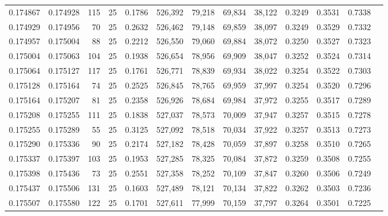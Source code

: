 \begin{tabular}{rrrrrrrrrrrrr}
0.174867 & 0.174928 &   115 &  25 &                                     0.1786 & 526,392 &  79,218 &  69,834 &  38,122 & 0.3249 & 0.3531 & 0.7338 \\
0.174929 & 0.174956 &    70 &  25 &                                     0.2632 & 526,462 &  79,148 &  69,859 &  38,097 & 0.3249 & 0.3529 & 0.7332 \\
0.174957 & 0.175004 &    88 &  25 &                                     0.2212 & 526,550 &  79,060 &  69,884 &  38,072 & 0.3250 & 0.3527 & 0.7323 \\
0.175004 & 0.175063 &   104 &  25 &                                     0.1938 & 526,654 &  78,956 &  69,909 &  38,047 & 0.3252 & 0.3524 & 0.7314 \\
0.175064 & 0.175127 &   117 &  25 &                                     0.1761 & 526,771 &  78,839 &  69,934 &  38,022 & 0.3254 & 0.3522 & 0.7303 \\
0.175128 & 0.175164 &    74 &  25 &                                     0.2525 & 526,845 &  78,765 &  69,959 &  37,997 & 0.3254 & 0.3520 & 0.7296 \\
0.175164 & 0.175207 &    81 &  25 &                                     0.2358 & 526,926 &  78,684 &  69,984 &  37,972 & 0.3255 & 0.3517 & 0.7289 \\
0.175208 & 0.175255 &   111 &  25 &                                     0.1838 & 527,037 &  78,573 &  70,009 &  37,947 & 0.3257 & 0.3515 & 0.7278 \\
0.175255 & 0.175289 &    55 &  25 &                                     0.3125 & 527,092 &  78,518 &  70,034 &  37,922 & 0.3257 & 0.3513 & 0.7273 \\
0.175290 & 0.175336 &    90 &  25 &                                     0.2174 & 527,182 &  78,428 &  70,059 &  37,897 & 0.3258 & 0.3510 & 0.7265 \\
0.175337 & 0.175397 &   103 &  25 &                                     0.1953 & 527,285 &  78,325 &  70,084 &  37,872 & 0.3259 & 0.3508 & 0.7255 \\
0.175398 & 0.175436 &    73 &  25 &                                     0.2551 & 527,358 &  78,252 &  70,109 &  37,847 & 0.3260 & 0.3506 & 0.7249 \\
0.175437 & 0.175506 &   131 &  25 &                                     0.1603 & 527,489 &  78,121 &  70,134 &  37,822 & 0.3262 & 0.3503 & 0.7236 \\
0.175507 & 0.175580 &   122 &  25 &                                     0.1701 & 527,611 &  77,999 &  70,159 &  37,797 & 0.3264 & 0.3501 & 0.7225 \\

\end{tabular}
